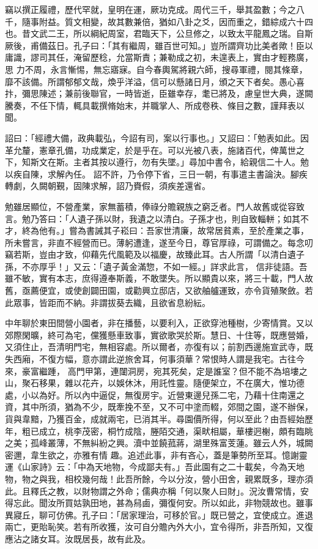 \begin{pinyinscope}
 竊以撰正履禮，歷代罕就，皇明在運，厥功克成。周代三千，舉其盈數；今之八千，隨事附益。質文相變，故其數兼倍，猶如八卦之爻，因而重之，錯綜成六十四也。昔文武二王，所以綱紀周室，君臨天下，公旦修之，以致太平龍鳳之瑞。自斯厥後，甫備茲日。孔子曰：「其有繼周，雖百世可知。」豈所謂齊功比美者歟！臣以庸識，謬司其任，淹留歷稔，允當斯責；兼勒成之初，未遑表上，實由才輕務廣，思
 力不周，永言慚惕，無忘寤寐。自今春輿駕將親六師，搜尋軍禮，閱其條章，靡不該備。所謂郁郁文哉，煥乎洋溢，信可以懸諸日月，頒之天下者矣。愚心喜抃，彌思陳述；兼前後聯官，一時皆逝，臣雖幸存，耄已將及，慮皇世大典，遂闕騰奏，不任下情，輒具載撰脩始末，并職掌人、所成卷秩、條目之數，謹拜表以聞。



 詔曰：「經禮大備，政典載弘，今詔有司，案以行事也。」又詔曰：「勉表如此。因革允釐，憲章孔備，功成業定，於是乎在。可以光被八表，施諸百代，俾萬世之下，知斯文在斯。主者其按以遵行，勿有失墜。」尋加中書令，給親信二十人。勉以疾自陳，求解內任。
 詔不許，乃令停下省，三日一朝，有事遣主書論決。腳疾轉劇，久闕朝覲，固陳求解，詔乃賚假，須疾差還省。



 勉雖居顯位，不營產業，家無蓄積，俸祿分贍親族之窮乏者。門人故舊或從容致言。勉乃答曰：「人遺子孫以財，我遺之以清白。子孫才也，則自致輜軿；如其不才，終為他有。」嘗為書誡其子崧曰：吾家世清廉，故常居貧素，至於產業之事，所未嘗言，非直不經營而已。薄躬遭逢，遂至今日，尊官厚祿，可謂備之。每念叨竊若斯，豈由才致，仰藉先代風範及以福慶，故臻此耳。古人所謂「以清白遺子孫，不亦厚乎！」又云：「遺子黃金滿惣，不如一經。」詳求此言，
 信非徒語。吾雖不敏，實有本志，庶得遵奉斯義，不敢墜失。所以顯貴以來，將三十載，門人故舊，亟薦便宜，或使創闢田園，或勸興立邸店，又欲舳艫運致，亦令貨殖聚斂。若此眾事，皆距而不納。非謂拔葵去織，且欲省息紛紜。



 中年聊於東田間營小園者，非在播藝，以要利入，正欲穿池種樹，少寄情賞。又以郊際閑曠，終可為宅，儻獲懸車致事，實欲歌哭於斯。慧日、十住等，既應營婚，又須住止，吾清明門宅，無相容處。所以爾者，亦復有以；前割西邊施宣武寺，既失西廂，不復方幅，意亦謂此逆旅舍耳，何事須華？常恨時人謂是我宅。古往今來，豪富繼踵，
 高門甲第，連闥洞房，宛其死矣，定是誰室？但不能不為培塿之山，聚石移果，雜以花卉，以娛休沐，用託性靈。隨便架立，不在廣大，惟功德處，小以為好。所以內中逼促，無復房宇。近營東邊兒孫二宅，乃藉十住南還之資，其中所須，猶為不少，既牽挽不至，又不可中塗而輟，郊間之園，遂不辦保，貨與韋黯，乃獲百金，成就兩宅，已消其半。尋園價所得，何以至此？由吾經始歷年，粗已成立，桃李茂密，桐竹成陰，塍陌交通，渠畎相屬，華樓迥榭，頗有臨眺之美；孤峰叢薄，不無糾紛之興。瀆中並饒菰蔣，湖里殊富芰蓮。雖云人外，城闕密邇，韋生欲之，亦雅有情
 趣。追述此事，非有吝心，蓋是筆勢所至耳。憶謝靈運《山家詩》云：「中為天地物，今成鄙夫有。」吾此園有之二十載矣，今為天地物，物之與我，相校幾何哉！此吾所餘，今以分汝，營小田舍，親累既多，理亦須此。且釋氏之教，以財物謂之外命；儒典亦稱「何以聚人曰財」。況汝曹常情，安得忘此。聞汝所買姑孰田地，甚為舄鹵，彌復何安。所以如此，非物競故也。雖事異寢丘，聊可仿佛。孔子曰：「居家理治，可移於官。」既已營之，宜使成立。進退兩亡，更貽恥笑。若有所收獲，汝可自分贍內外大小，宜令得所，非吾所知，又復應沾之諸女耳。汝既居長，故有此及。




\end{pinyinscope}
